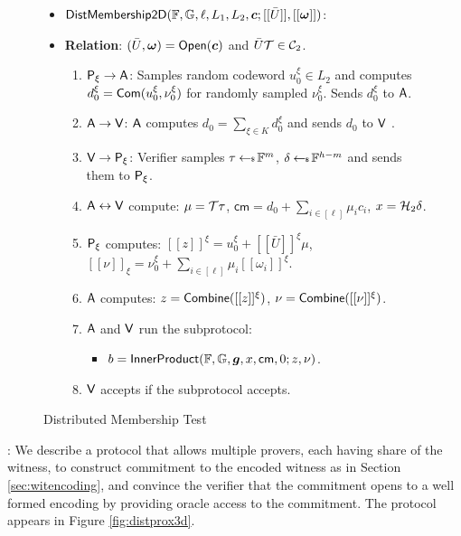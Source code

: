 \begin{figure}[h!]
\centering
\begin{framed}
\begin{itemize}
\item $\mathsf{DistMembership2D}(\mathbb{F},\mathbb{G},\ell,L_1,L_2,\bm{c};[[\bar{U}]],[[\bm{\omega}]])$:
\item {\bf Relation}: $(\bar{U},\bm{\omega})=\mathsf{Open}(\bm{c})$ and
$\bar{U}\mathcal{T}\in \mathcal{C}_2$.
\begin{enumerate}[{\rm 1.}]
\item $\mathsf{P}_\xi\rightarrow \mathsf{A}$: Samples random codeword $u^\xi_0\in L_2$ and
computes $d^\xi_0=\mathsf{Com}(u^\xi_0,\nu^\xi_0)$ for randomly sampled $\nu^\xi_0$.
Sends $d^\xi_0$ to $\mathsf{A}$.
\item {\color{red} $\mathsf{A}\rightarrow \mathsf{V}$: $\mathsf{A}$ computes $d_0=\sum_{\xi\in
K}d^\xi_0$ and sends $d_0$ to $\mathsf{V}$ }.
\item $\mathsf{V}\rightarrow \mathsf{P}_\xi$: Verifier samples $\tau\hskip2.3pt{\gets\!\!\mbox{\tiny${\$}$\normalsize}}\, \mathbb{F}^m$,
$\delta\hskip2.3pt{\gets\!\!\mbox{\tiny${\$}$\normalsize}}\, \mathbb{F}^{h-m}$ and sends them to $\mathsf{P}_\xi$.
\item $\mathsf{A}\leftrightarrow \mathsf{V}$ compute: $\mu=\mathcal{T}\tau$,
$\mathsf{cm}=d_0+\sum_{i\in [\ell]}\mu_ic_i$, $x=\mathcal{H}_2\delta$.
\item $\mathsf{P}_\xi$ computes: $[[z]]^\xi=u^\xi_0+[[\bar{U}]]^\xi\mu$,
$[[\nu]]_\xi=\nu^\xi_0+\sum_{i\in [\ell]}\mu_i[[\omega_i]]^\xi$.
\item {\color{red} $\mathsf{A}$ computes: $z=\mathsf{Combine}([[z]]^\xi)$,
$\nu=\mathsf{Combine}([[\nu]]^\xi)$}.
\item $\mathsf{A}$ and $\mathsf{V}$ run the subprotocol:
	\begin{itemize}
	\item $b=\mathsf{InnerProduct}(\mathbb{F},\mathbb{G},\bm{g},x,\mathsf{cm},0;z,\nu)$.
	\end{itemize}
\item $\mathsf{V}$ accepts if the subprotocol accepts.
\end{enumerate}
\end{itemize}
\end{framed}
\caption{Distributed Membership Test}
\label{fig:distprox2d}
\end{figure}

: We describe a protocol that allows
multiple provers, each having share of the witness, to construct commitment to
the encoded witness as in Section \ref{sec:witencoding}, and convince the
verifier that the commitment opens to a well formed encoding by providing oracle
access to the commitment. The protocol appears in Figure
\ref{fig:distprox3d}.\smallskip


